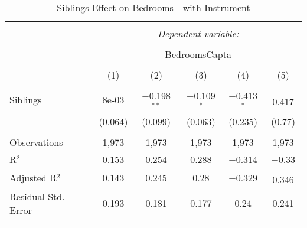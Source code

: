 
\begin{table}[H] \centering 
  \caption{Siblings Effect on Bedrooms - with Instrument} 
  \label{} 
\begin{tabular}{@{\extracolsep{5pt}}lccccc} 
\\[-1.8ex]\hline 
\hline \\[-1.8ex] 
 & \multicolumn{5}{c}{\textit{Dependent variable:}} \\ 
\cline{2-6} 
\\[-1.8ex] & \multicolumn{5}{c}{BedroomsCapta} \\ 
\\[-1.8ex] & (1) & (2) & (3) & (4) & (5)\\ 
\hline \\[-1.8ex] 
 Siblings & 8e-03 & $-$0.198$^{**}$ & $-$0.109$^{*}$ & $-$0.413$^{*}$ & $-$0.417 \\ 
  & (0.064) & (0.099) & (0.063) & (0.235) & (0.77) \\ 
 \hline \\[-1.8ex] 
Observations & 1,973 & 1,973 & 1,973 & 1,973 & 1,973 \\ 
R$^{2}$ & 0.153 & 0.254 & 0.288 & $-$0.314 & $-$0.33 \\ 
Adjusted R$^{2}$ & 0.143 & 0.245 & 0.28 & $-$0.329 & $-$0.346 \\ 
Residual Std. Error & 0.193 & 0.181 & 0.177 & 0.24 & 0.241 \\ 
\hline 
\hline \\[-1.8ex] 
\end{tabular} 
\end{table} 
